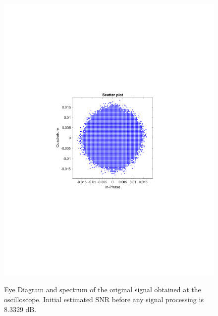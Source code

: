 \begin{refsection}
\begin{figure}[H]
\begin{minipage}{0.30\textwidth}
		\includegraphics[clip, trim=4cm 8cm 4cm 8cm, width=1\textwidth]{./sdf/m_qam_system/figures/expResults/homodyne/0_const_16GBdInSig13dB_bfFec.pdf}
		\label{fig:16GBdSpecBefFecCHm}
	\end{minipage}
	\caption{Eye Diagram and spectrum of the original signal obtained at the oscilloscope. Initial estimated SNR before any signal processing is 8.3329 dB.}
	\label{fig:16GBdinitHm}
\end{figure}


\end{refsection}
